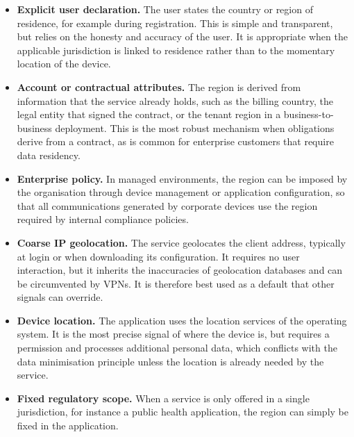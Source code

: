 \documentclass[
A4paper,                %
twoside,                %
openright,              %
chapterprefix=true,     %
12pt,                   %
headings=normal,        %
titlepage=on            %
]{book}
\begin{document}
\begin{itemize}
    \item \textbf{Explicit user declaration.} The user states the country or region of residence, for example during registration. This is simple and transparent, but relies on the honesty and accuracy of the user. It is appropriate when the applicable jurisdiction is linked to residence rather than to the momentary location of the device.

    \item \textbf{Account or contractual attributes.} The region is derived from information that the service already holds, such as the billing country, the legal entity that signed the contract, or the tenant region in a business-to-business deployment. This is the most robust mechanism when obligations derive from a contract, as is common for enterprise customers that require data residency.

    \item \textbf{Enterprise policy.} In managed environments, the region can be imposed by the organisation through device management or application configuration, so that all communications generated by corporate devices use the region required by internal compliance policies.

    \item \textbf{Coarse IP geolocation.} The service geolocates the client address, typically at login or when downloading its configuration. It requires no user interaction, but it inherits the inaccuracies of geolocation databases \cite{Poese2011IPUnreliable, Cozar2022ReliabilityTransfers} and can be circumvented by VPNs. It is therefore best used as a default that other signals can override.

    \item \textbf{Device location.} The application uses the location services of the operating system. It is the most precise signal of where the device is, but requires a permission and processes additional personal data, which conflicts with the data minimisation principle unless the location is already needed by the service.

    \item \textbf{Fixed regulatory scope.} When a service is only offered in a single jurisdiction, for instance a public health application, the region can simply be fixed in the application.
\end{itemize}
\end{document}

